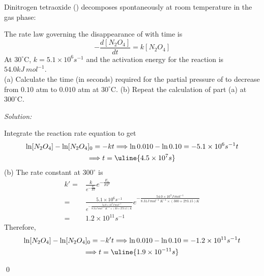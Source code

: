 \documentclass[12pt]{article}
\newenvironment{problem}[2][Problem]{\begin{trivlist}
\item[\hskip \labelsep {\bfseries #1}\hskip \labelsep {\bfseries #2.}]}{\end{trivlist}}
\newenvironment{sol}
    {\emph{Solution:}
    }
    {
    \qed
    }
\begin{document}
\begin{problem}{18.38}
Dinitrogen tetraoxide () decomposes spontaneously at
room temperature in the gas phase:
\begin{center}
\end{center}
The rate law governing the disappearance of  with time is
\[
-\frac{d[N_2O_4]}{dt}=k[N_2O_4]
\]
At $30^{\circ}$C, $k=5.1\times10^6s^{-1}$ and the activation energy for the reaction is $54.0 kJ~mol^{-1}$.\\
(a) Calculate the time (in seconds) required for the partial pressure of  to decrease from $0.10$ atm to $0.010$ atm at $30^{\circ}$C.
(b) Repeat the calculation of part (a) at $300^{\circ}$C.
\end{problem}
\begin{sol}
Integrate the reaction rate equation to get
\begin{gather*}
\ln[N_2O_4]-\ln[N_2O_4]_0=-kt\Longrightarrow\ln0.010-\ln0.10=-5.1\times10^6s^{-1}t\\
\Longrightarrow t=\uline{4.5\times10^7s}
\end{gather*}
(b) The rate constant at $300^{\circ}$ is
\begin{align*}
k'=&\frac{k}{e^{-\frac{E_a}{RT}}}e^{-\frac{E_a}{RT'}}\\
=&\frac{5.1\times10^6s^{-1}}{e^{-\frac{54.0\times10^3J~mol^{-1}}{8.31J~mol^{-1}~K^{-1}\times(30+273.15)K}}}e^{-\frac{54.0\times10^3J~mol^{-1}}{8.31J~mol^{-1}~K^{-1}\times(300+273.15)K}}\\
=&1.2\times10^{11}s^{-1}
\end{align*}
Therefore,
\begin{gather*}
\ln[N_2O_4]-\ln[N_2O_4]_0=-k't\Longrightarrow\ln0.010-\ln0.10=-1.2\times10^{11}s^{-1}t\\
\Longrightarrow t=\uline{1.9\times10^{-11}s}
\end{gather*}
\end{sol}
\end{document}
